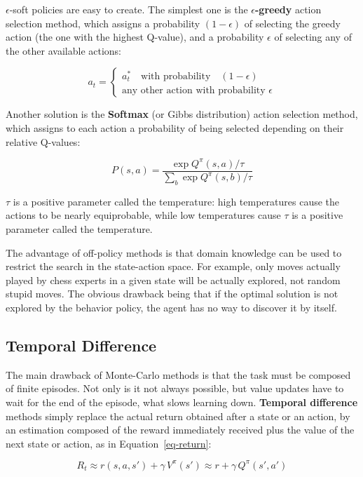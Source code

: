\documentclass[
  letterpaper,
  DIV=11,
  numbers=noendperiod]{scrreprt}
\begin{document}
\(\epsilon\)-soft policies are easy to create. The simplest one is the
\textbf{\(\epsilon\)-greedy} action selection method, which assigns a
probability \((1-\epsilon)\) of selecting the greedy action (the one
with the highest Q-value), and a probability \(\epsilon\) of selecting
any of the other available actions:

\[
    a_t = \begin{cases} a_t^* \quad \text{with probability} \quad (1 - \epsilon) \\
                       \text{any other action with probability } \epsilon \end{cases}
\]

Another solution is the \textbf{Softmax} (or Gibbs distribution) action
selection method, which assigns to each action a probability of being
selected depending on their relative Q-values:

\[
    P(s, a) = \frac{\exp Q^\pi(s, a) / \tau}{ \sum_b \exp Q^\pi(s, b) / \tau}
\]

\(\tau\) is a positive parameter called the temperature: high
temperatures cause the actions to be nearly equiprobable, while low
temperatures cause \(\tau\) is a positive parameter called the
temperature.

The advantage of off-policy methods is that domain knowledge can be used
to restrict the search in the state-action space. For example, only
moves actually played by chess experts in a given state will be actually
explored, not random stupid moves. The obvious drawback being that if
the optimal solution is not explored by the behavior policy, the agent
has no way to discover it by itself.

\hypertarget{temporal-difference}{%
\subsection{Temporal Difference}\label{temporal-difference}}

The main drawback of Monte-Carlo methods is that the task must be
composed of finite episodes. Not only is it not always possible, but
value updates have to wait for the end of the episode, what slows
learning down. \textbf{Temporal difference} methods simply replace the
actual return obtained after a state or an action, by an estimation
composed of the reward immediately received plus the value of the next
state or action, as in Equation~\ref{eq-return}:

\[
    R_t \approx r(s, a, s') + \gamma \, V^\pi(s') \approx r + \gamma \, Q^\pi(s', a')
\]
\end{document}
